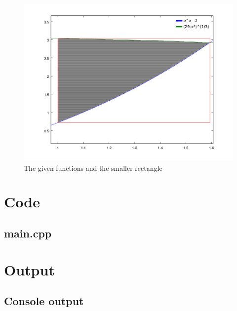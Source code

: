 \documentclass[11pt, a4paper, titlepage, openright]{article}
\begin{document}
            \begin{figure}[H]
                \begin{minipage}[b]{0.49\textwidth}
                    \includegraphics[width=12cm]{../images/rectangleSmaller}
                \end{minipage}
                \hfill
                \caption{The given functions and the smaller rectangle}
	            \label{fig:rect2}
            \end{figure}

\onecolumn
\appendix
\appendixpage
\addappheadtotoc

\section{Code}
	\subsection{main.cpp}
		
	\bigskip

\newpage
\section{Output}
\label{sec:output}
	\subsection{Console output}
	\label{sec:consoleOut}
		
    
\end{document}
